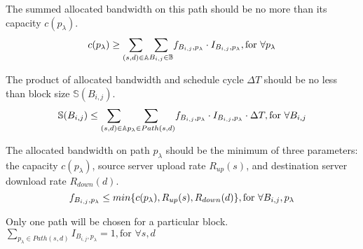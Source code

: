 \begin{packeditemize}
\item The summed allocated bandwidth on this path should be no more than its capacity $c(p_\lambda)$.
\begin{equation}
c(p_\lambda) \geq  \displaystyle{\sum_{(s,d)\in \mathbb{A}}} \displaystyle{\sum_{B_{i,j} \in \mathbb{B}}} f_{B_{i,j},p_\lambda} \cdot I_{B_{i,j},p_\lambda}, \text{for }\forall p_\lambda\\
\end{equation}

\item The product of allocated bandwidth and schedule cycle $\Delta T$ should be no less than block size $\mathbb{S}(B_{i,j})$.
\begin{equation}
\mathbb{S}(B_{i,j}) \leq  \displaystyle{\sum_{(s,d)\in \mathbb{A}}} \displaystyle{\sum_{p_{\lambda}\in Path(s,d)}} f_{B_{i,j},p_\lambda} \cdot I_{B_{i,j},p_\lambda} \cdot \Delta T, \text{for }\forall B_{i,j}\\
\end{equation}

\item The allocated bandwidth on path $p_\lambda$ should be the minimum of three parameters: the capacity $c(p_\lambda)$, source server upload rate $R_{up}(s)$, and destination server download rate $R_{down}(d)$.
\begin{equation}
f_{B_{i,j},p_\lambda} \leq  min \{c(p_\lambda),R_{up}(s),R_{down}(d)\}, \text{for }\forall B_{i,j}, p_\lambda\\
\end{equation}

\item Only one path will be chosen for a particular block.
$\displaystyle{\sum_{p_\lambda \in Path(s,d)}} I_{B_{i,j},p_\lambda} = 1, \text{for }\forall s,d$
\end{packeditemize}
